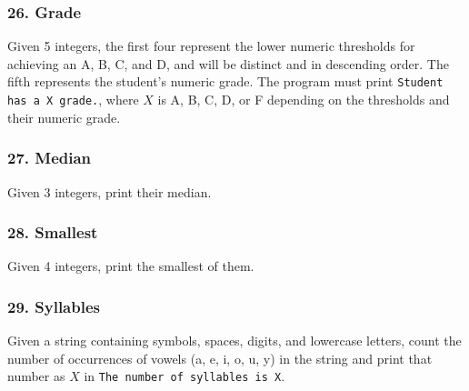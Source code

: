 \documentclass{sig-alternate}
\begin{document}
\subsubsection*{26. Grade}
Given 5 integers, the first four represent the lower numeric thresholds for achieving an A, B, C, and D, and will be distinct and in descending order. The fifth represents the student's numeric grade. The program must print \texttt{Student has a X grade.}, where $X$ is A, B, C, D, or F depending on the thresholds and their numeric grade.

\subsubsection*{27. Median}
Given 3 integers, print their median.

\subsubsection*{28. Smallest}
Given 4 integers, print the smallest of them.

\subsubsection*{29. Syllables}
Given a string containing symbols, spaces, digits, and lowercase letters, count the number of occurrences of vowels (a, e, i, o, u, y) in the string and print that number as $X$ in \texttt{The number of syllables is X}.
\end{document}
